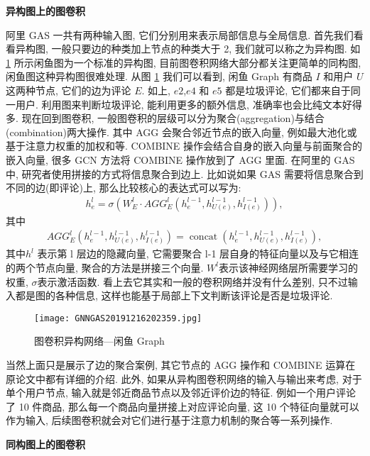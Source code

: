 \textbf{异构图上的图卷积}

阿里 GAS 一共有两种输入图, 它们分别用来表示局部信息与全局信息. 首先我们看看异构图, 一般只要边的种类加上节点的种类大于 2, 我们就可以称之为异构图. 
如 \ref{GNNGAS20191216202359} 所示闲鱼图为一个标准的异构图, 目前图卷积网络大部分都关注更简单的同构图, 闲鱼图这种异构图很难处理.
从图 \ref{GNNGAS20191216202359} 我们可以看到, 闲鱼 Graph 有商品 $I$ 和用户 $U$ 这两种节点, 它们的边为评论 $E$. 
如上, $e2$,$e4$ 和 $e5$ 都是垃圾评论, 它们都来自于同一用户. 利用图来判断垃圾评论, 能利用更多的额外信息, 准确率也会比纯文本好得多.
现在回到图卷积, 一般图卷积的层级可以分为聚合(aggregation)与结合(combination)两大操作. 
其中 AGG 会聚合邻近节点的嵌入向量, 例如最大池化或基于注意力权重的加权和等. 
COMBINE 操作会结合自身的嵌入向量与前面聚合的嵌入向量, 很多 GCN 方法将 COMBINE 操作放到了 AGG 里面. 
在阿里的 GAS 中, 研究者使用拼接的方式将信息聚合到边上. 比如说如果 GAS 需要将信息聚合到不同的边(即评论)上, 那么比较核心的表达式可以写为:
\begin{align}
    h_{e}^{l}=\sigma\left(W_{E}^{l} \cdot A G G_{E}^{l}\left(h_{e}^{l-1}, h_{U(e)}^{l-1}, h_{I(e)}^{l-1}\right)\right),
\end{align}
其中
\begin{align*}
    A G G_{E}^{l}\left(h_{e}^{l-1}, h_{U(e)}^{l-1}, h_{I(e)}^{l-1}\right)=\operatorname{concat}\left(h_{e}^{l-1}, h_{U(e)}^{l-1}, h_{I(e)}^{l-1}\right),
\end{align*}
其中$ h^l$ 表示第 l 层边的隐藏向量, 它需要聚合 l-1 层自身的特征向量以及与它相连的两个节点向量, 聚合的方法是拼接三个向量.
$W^l$表示该神经网络层所需要学习的权重, $\sigma$表示激活函数.
看上去它其实和一般的卷积网络并没有什么差别, 只不过输入都是图的各种信息, 这样也能基于局部上下文判断该评论是否是垃圾评论.
\begin{figure}[H]
    \centering
    \texttt{[image: GNNGAS20191216202359.jpg]}
    \caption{图卷积异构网络---闲鱼 Graph}
    \label{GNNGAS20191216202359}
    \vspace{-0.4cm}
\end{figure}
当然上面只是展示了边的聚合案例, 其它节点的 AGG 操作和 COMBINE 运算在原论文中都有详细的介绍.  此外, 如果从异构图卷积网络的输入与输出来考虑,
对于单个用户节点, 输入就是邻近商品节点以及邻近评价边的特征.
例如一个用户评论了 10 件商品, 那么每一个商品向量拼接上对应评论向量, 这 10 个特征向量就可以作为输入, 后续图卷积就会对它们进行基于注意力机制的聚合等一系列操作.

\textbf{同构图上的图卷积}

